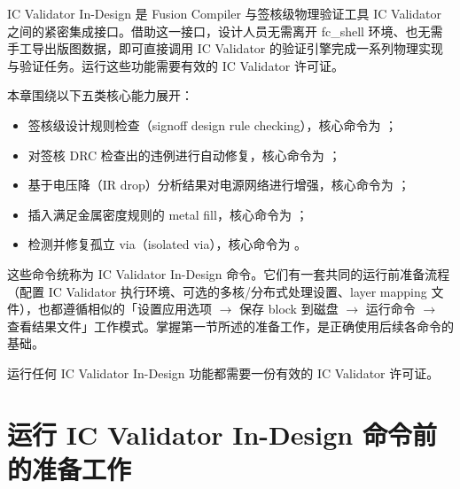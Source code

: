 \label{chap:icv}


IC Validator In-Design 是 Fusion Compiler 与签核级物理验证工具 IC Validator 之间的紧密集成接口。借助这一接口，设计人员无需离开 fc\_shell 环境、也无需手工导出版图数据，即可直接调用 IC Validator 的验证引擎完成一系列物理实现与验证任务。运行这些功能需要有效的 IC Validator 许可证。

本章围绕以下五类核心能力展开：
\begin{itemize}
  \item 签核级设计规则检查（signoff design rule checking），核心命令为 ；
  \item 对签核 DRC 检查出的违例进行自动修复，核心命令为 ；
  \item 基于电压降（IR drop）分析结果对电源网络进行增强，核心命令为 ；
  \item 插入满足金属密度规则的 metal fill，核心命令为 ；
  \item 检测并修复孤立 via（isolated via），核心命令为 。
\end{itemize}

这些命令统称为 IC Validator In-Design 命令。它们有一套共同的运行前准备流程（配置 IC Validator 执行环境、可选的多核/分布式处理设置、layer mapping 文件），也都遵循相似的「设置应用选项 $\to$ 保存 block 到磁盘 $\to$ 运行命令 $\to$ 查看结果文件」工作模式。掌握第一节所述的准备工作，是正确使用后续各命令的基础。

\begin{noteBox}
运行任何 IC Validator In-Design 功能都需要一份有效的 IC Validator 许可证。
\end{noteBox}

\section{运行 IC Validator In-Design 命令前的准备工作}
